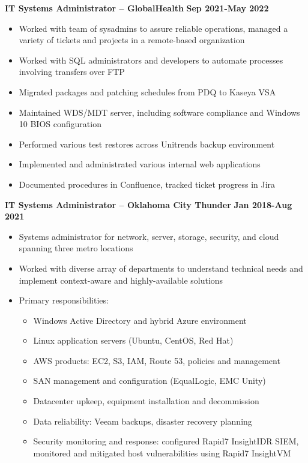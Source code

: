 \documentclass[line]{res}
\begin{document}
\begin{resume}
\textbf{IT Systems Administrator -- GlobalHealth}
\newline
\textbf{Sep 2021-May 2022}
	\begin{itemize}
		\item Worked with team of sysadmins to assure reliable operations, managed a variety of tickets and projects in a remote-based organization
		\item Worked with SQL administrators and developers to automate processes involving transfers over FTP
		\item Migrated packages and patching schedules from PDQ to Kaseya VSA
		\item Maintained WDS/MDT server, including software compliance and Windows 10 BIOS configuration
		\item Performed various test restores across Unitrends backup environment
		\item Implemented and administrated various internal web applications
		\item Documented procedures in Confluence, tracked ticket progress in Jira 
	\end{itemize}
\textbf{IT Systems Administrator -- Oklahoma City Thunder}
\newline
\textbf{Jan 2018-Aug 2021}
	\begin{itemize}
		\item Systems administrator for network, server, storage, security, and cloud spanning three metro locations
		\item Worked with diverse array of departments to understand technical needs and implement context-aware and highly-available solutions
		\item Primary responsibilities:
			\begin{itemize}
				\item Windows Active Directory and hybrid Azure environment
				\item Linux application servers (Ubuntu, CentOS, Red Hat)
				\item AWS products: EC2, S3, IAM, Route 53, policies and management
				\item SAN management and configuration (EqualLogic, EMC Unity)
				\item Datacenter upkeep, equipment installation and decommission
				\item Data reliability: Veeam backups, disaster recovery planning
				\item Security monitoring and response: configured Rapid7 InsightIDR SIEM, monitored and mitigated host vulnerabilities using Rapid7 InsightVM

\end{itemize}
\end{itemize}
\end{resume}
\end{document}
